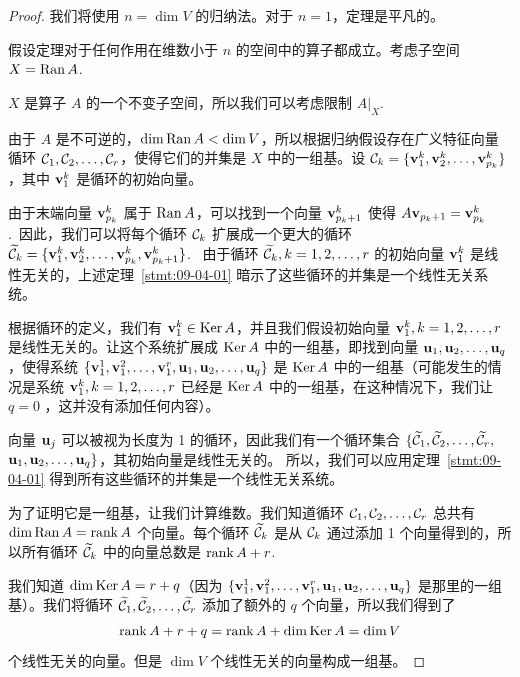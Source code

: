 
\begin{proof}我们将使用 $n = \dim V$ 的归纳法。对于 $n=1$，定理是平凡的。

假设定理对于任何作用在维数小于 $n$ 的空间中的算子都成立。考虑子空间 $X = \operatorname{Ran} A$.~

$X$ 是算子 $A$ 的一个不变子空间，所以我们可以考虑限制 $A|_X$.~

由于 $A$ 是不可逆的，$\dim \operatorname{Ran} A < \dim V$，所以根据归纳假设存在广义特征向量循环 $\mathcal{C}_1, \mathcal{C}_2, \dots, \mathcal{C}_r$，使得它们的并集是 $X$ 中的一组基。设 $\mathcal{C}_k = \{\mathbf{v}^{k}_{1}, \mathbf{v}^{k}_{2}, \dots, \mathbf{v}^{k}_{p_k}\}$，其中 $\mathbf{v}^{k}_{1}$ 是循环的初始向量。

由于末端向量 $\mathbf{v}^{k}_{p_k}$ 属于 $\operatorname{Ran} A$，可以找到一个向量 $\mathbf{v}^{k}_{p_k+1}$ 使得 $A \mathbf{v}_{p_k+1} = \mathbf{v}^{k}_{p_k}$.~因此，我们可以将每个循环 $\mathcal{C}_k$ 扩展成一个更大的循环 $\widetilde{\mathcal{C}}_k = \{\mathbf{v}^{k}_{1}, \mathbf{v}^{k}_{2}, \dots, \mathbf{v}^{k}_{p_k}, \mathbf{v}^{k}_{p_k+1}\}$.~
由于循环 $\widetilde{\mathcal{C}}_k, k = 1, 2, \dots, r$ 的初始向量 $\mathbf{v}^{k}_{1}$ 是线性无关的，上述定理~\ref{stmt:09-04-01} 暗示了这些循环的并集是一个线性无关系统。

根据循环的定义，我们有 $\mathbf{v}^{k}_{1} \in \operatorname{Ker} A$，并且我们假设初始向量 $\mathbf{v}^{k}_{1}, k = 1, 2, \dots, r$ 是线性无关的。让这个系统扩展成 $\operatorname{Ker} A$ 中的一组基，即找到向量 $\mathbf{u}_1, \mathbf{u}_2, \dots, \mathbf{u}_q$，使得系统 $\{\mathbf{v}^{1}_{1}, \mathbf{v}^{2}_{1}, \dots, \mathbf{v}^{r}_{1}, \mathbf{u}_1, \mathbf{u}_2, \dots, \mathbf{u}_q\}$ 是 $\operatorname{Ker} A$ 中的一组基（可能发生的情况是系统 $\mathbf{v}^{k}_{1}, k = 1, 2, \dots, r$ 已经是 $\operatorname{Ker} A$ 中的一组基，在这种情况下，我们让 $q = 0$ ，这并没有添加任何内容）。

向量 $\mathbf{u}_j$ 可以被视为长度为 1 的循环，因此我们有一个循环集合 $\{\widetilde{\mathcal{C}}_1, \widetilde{\mathcal{C}}_2, \dots, \widetilde{\mathcal{C}}_r, $ $\mathbf{u}_1, \mathbf{u}_2, \dots, \mathbf{u}_q\}$，其初始向量是线性无关的。
所以，我们可以应用定理~\ref{stmt:09-04-01} 得到所有这些循环的并集是一个线性无关系统。

为了证明它是一组基，让我们计算维数。我们知道循环 $\mathcal{C}_1, \mathcal{C}_2, \dots, \mathcal{C}_r$ 总共有 $\dim \operatorname{Ran} A = \operatorname{rank} A$ 个向量。每个循环 $\widetilde{\mathcal{C}}_k$ 是从 $\mathcal{C}_k$ 通过添加 1 个向量得到的，所以所有循环 $\widetilde{\mathcal{C}}_k$ 中的向量总数是 $\operatorname{rank} A + r$.~

我们知道 $\dim \operatorname{Ker} A = r + q$（因为 $\{\mathbf{v}^{1}_{1}, \mathbf{v}^{2}_{1}, \dots, \mathbf{v}^{r}_{1}, \mathbf{u}_1, \mathbf{u}_2, \dots, \mathbf{u}_q\}$ 是那里的一组基）。我们将循环 $\widetilde{\mathcal{C}}_1, \widetilde{\mathcal{C}}_2, \dots, \widetilde{\mathcal{C}}_r$ 添加了额外的 $q$ 个向量，所以我们得到了 $$\operatorname{rank} A + r + q = \operatorname{rank} A + \dim \operatorname{Ker} A = \dim V$$
个线性无关的向量。但是 $\dim V$ 个线性无关的向量构成一组基。\end{proof}


